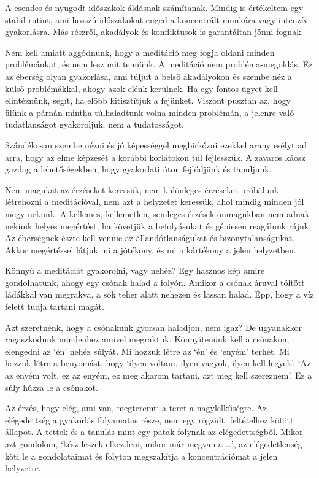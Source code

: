 \clearpage
\normalpagelayout

A csendes és nyugodt időszakok áldásnak számítanak. Mindig is értékeltem
egy stabil rutint, ami hosszú időszakokat enged a koncentrált munkára
vagy intenzív gyakorlásra. Más részről, akadályok és konfliktusok is
garantáltan jönni fognak.

Nem kell amiatt aggódnunk, hogy a meditáció meg fogja oldani minden
problémánkat, és nem lesz mit tennünk. A meditáció nem
probléma-megoldás. Ez az éberség olyan gyakorlása, ami túljut a belső
akadályokon és szembe néz a külső problémákkal, ahogy azok elénk
kerülnek. Ha egy fontos ügyet kell elintéznünk, segít, ha előbb
kitisztítjuk a fejünket. Viszont pusztán az, hogy ülünk a párnán mintha
túlhaladtunk volna minden problémán, a jelenre való tudatlanságot
gyakoroljuk, nem a tudatosságot.

Szándékosan szembe nézni és jó képességgel megbirkózni ezekkel arany
esélyt ad arra, hogy az elme képzését a korábbi korlátokon túl
fejlesszük. A zavaros káosz gazdag a lehetőségekben, hogy gyakorlati
úton fejlődjünk és tanuljunk.

Nem magukat az érzéseket keressük, nem különleges érzéseket próbálunk
létrehozni a meditációval, nem azt a helyzetet keressük, ahol mindig
minden jól megy nekünk. A kellemes, kellemetlen, semleges érzések
önmagukban nem adnak nekünk helyes megértést, ha követjük a befolyásukat
és gépiesen reagálunk rájuk. Az éberségnek észre kell vennie az
állandótlanságukat és bizonytalanságukat. Akkor megértéssel látjuk mi a
jótékony, és mi a kártékony a jelen helyzetben.


Könnyű a meditációt gyakorolni, vagy nehéz? Egy hasznos kép amire
gondolhatunk, ahogy egy csónak halad a folyón. Amikor a csónak áruval
töltött ládákkal van megrakva, a sok teher alatt nehezen és lassan
halad. Épp, hogy a víz felett tudja tartani magát.

Azt szeretnénk, hogy a csónakunk gyorsan haladjon, nem igaz? De
ugyanakkor ragaszkodunk mindenhez amivel megraktuk. Könnyítenünk kell a
csónakon, elengedni az `én' nehéz súlyát. Mi hozzuk létre az `én' és
`enyém' terhét. Mi hozzuk létre a benyomást, hogy `ilyen voltam, ilyen
vagyok, ilyen kell legyek'. `Az az enyém volt, ez az enyém, ez meg
akarom tartani, azt meg kell szereznem'. Ez a súly húzza le a csónakot.

Az érzés, hogy elég, ami van, megteremti a teret a nagylelkűségre. Az
elégedettség a gyakorlás folyamatos része, nem egy rögzült, feltételhez
kötött állapot. A tettek és a tanulás mint egy patak folynak az
elégedettségből. Mikor azt gondolom, `kész leszek elkezdeni, mikor már
megvan a \ldots{}', az elégedetlenség köti le a gondolataimat és folyton
megszakítja a koncentrációmat a jelen helyzetre.

